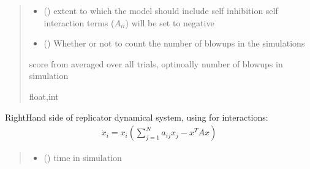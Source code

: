 \documentclass[letterpaper,10pt,english]{sphinxmanual}
\begin{document}
\begin{fulllineitems}
\begin{fulllineitems}
\begin{quote}
\begin{description}
\begin{itemize}
\item {} 
\sphinxAtStartPar
{} () \textendash{} extent to which the model should include self inhibition \sphinxhyphen{} self interaction terms (\(A_{ii}\)) will be set to negative 

\item {} 
\sphinxAtStartPar
{} () \textendash{} Whether or not to count the number of blow\sphinxhyphen{}ups in the simulations

\end{itemize}

\sphinxAtStartPar
score from {\hyperref[\detokenize{friendlynets:friendlyNet.friendlyNet.lotka_volterra_score_single}]{}} averaged over all trials, optinoally number of blowups in simulation

\sphinxAtStartPar
float,int

\end{description}\end{quote}

\end{fulllineitems}


\begin{fulllineitems}
\label{\detokenize{friendlynets:friendlyNet.friendlyNet.replicator_system}}
\pysigstartsignatures
{}
\pysigstopsignatures
\sphinxAtStartPar
Right\sphinxhyphen{}Hand side of replicator dynamical system, using {\hyperref[\detokenize{friendlynets:friendlyNet.friendlyNet.Adjacency}]{}} for interactions:
\begin{equation*}
\begin{split}\dot{x}_i = x_i(\sum_{j=1}^N a_{ij} x_j - x^TAx)\end{split}
\end{equation*}\begin{quote}\begin{description}
\begin{itemize}
\item {} 
\sphinxAtStartPar
{} () \textendash{} time in simulation


\end{itemize}
\end{description}
\end{quote}
\end{fulllineitems}
\end{fulllineitems}
\end{document}
